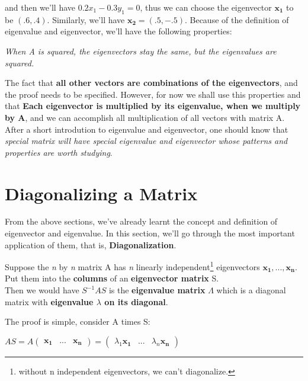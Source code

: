 \documentclass[12pt]{article}
\begin{document}
and then we'll have $0.2x_1 - 0.3y_1 = 0$, thus we can choose the eigenvector $\mathbf{x_{1}}$ to be $(.6, .4)$. Similarly, we'll have $\mathbf{x_{2}} = (.5, -.5)$.
Because of the definition of eigenvalue and eigenvector, we'll have the following properties:

\begin{center}
    \textit{When A is squared, the eigenvectors stay the same, but the eigenvalues are squared.}
\end{center}

The fact that \textbf{all other vectors are combinations of the eigenvectors}, and the proof needs to be specified. However, for now we shall use this properties and that \textbf{Each eigenvector is multiplied by its eigenvalue, when we multiply by A}, and we can accomplish all multiplication of all vectors with matrix A. After a short introdution to eigenvalue and eigenvector, one should know that \textit{special matrix will have special eigenvalue and eigenvector whose patterns and properties are worth studying}.

\section{Diagonalizing a Matrix}

From the above sections, we've already learnt the concept and definition of eigenvector and eigenvalue. In this section, we'll go through the most important application of them, that is, \textbf{Diagonalization}.

\begin{center}
    Suppose the \textit{n} by \textit{n} matrix A has \textit{n} linearly independent\footnote{without n independent eigenvectors, we can't diagonalize.} eigenvectors $\mathbf{x_1, ..., x_n}$. 
    \\
    Put them into the \textbf{columns} of an \textbf{eigenvector matrix} S. 
    \\
    Then we would have $S^{-1} A S$ is the \textbf{eigenvalue matrix} $\Lambda$ which is a diagonal matrix with \textbf{eigenvalue $\lambda$ on its diagonal}.
\end{center}

The proof is simple, consider A times S:

\begin{center}
    $AS = A \begin{pmatrix}
                \mathbf{x_1} & ... & \mathbf{x_n}
            \end{pmatrix} = \begin{pmatrix}
                \lambda_1\mathbf{x_1} & ... & \lambda_n\mathbf{x_n}
            \end{pmatrix}$
\end{center}
\end{document}
